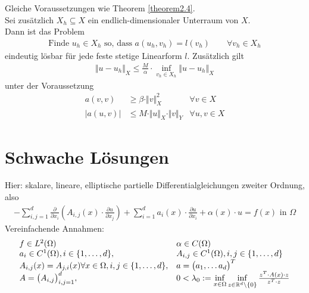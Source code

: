 \begin{theorem}\label{theorem2.5}
	Gleiche Voraussetzungen wie Theorem \ref{theorem2.4}.\\
	Sei zusätzlich $X_h\subseteq X$ ein endlich-dimensionaler Unterraum von $X$.\\
	Dann ist das Problem
	\begin{align*}
		\text{Finde }u_h\in X_h\text{ so, dass }
		a(u_h,v_h)=l(v_h)\qquad\forall v_h\in X_h
	\end{align*}
	eindeutig lösbar für jede feste stetige Linearform $l$. 
	Zusätzlich gilt
	\begin{align*}
		\Vert u-u_h\Vert_X\leq\frac{M}{\alpha}\cdot\inf\limits_{v_h\in X_h}\Vert u-u_h\Vert_X
	\end{align*}
	unter der Voraussetzung
	\begin{align*}
		a(v,v)&\geq\beta\cdot\Vert v\Vert^2_X &\forall v\in X\\
		\big|a(u,v)\big|&\leq M\cdot\Vert u\Vert_X\cdot\Vert v\Vert_Y &\forall u,v\in X
	\end{align*}
\end{theorem}

\section{Schwache Lösungen} %
Hier: skalare, lineare, elliptische partielle Differentialgleichungen zweiter Ordnung, also
\begin{align*}
	-\sum\limits_{i,j=1}^d\frac{\partial}{\partial x_i}\left(A_{i,j}(x)\cdot\frac{\partial u}{\partial x_j}\right)+\sum\limits_{i=1}^d a_i(x)\cdot\frac{\partial u}{\partial x_i}+\alpha(x)\cdot u=f(x)\text{ in }\Omega
\end{align*}
Vereinfachende Annahmen:
\begin{align*}
	\begin{array}{ll}
		f\in L^2(\Omega)&\alpha \in C(\Omega)\\
		a_i\in C^1(\Omega),i\in\lbrace1,\ldots,d\rbrace, & A_{i,j}\in C^1(\Omega), i,j\in\lbrace1,\ldots,d\rbrace\\
		A_{i,j}(x)=A_{j,i}(x)\forall x\in\Omega, i,j\in\lbrace1,\ldots,d\rbrace, & a=\big(a_1,\ldots a_d\big)^T\\
		A=\big(A_{i,j}\big)^d_{i,j=1},& 0<\lambda_0:=\inf\limits_{x\in\Omega}\inf\limits_{z\in\mathbb{R}^d\setminus\lbrace0\rbrace}\frac{z^T\cdot A(x)\cdot z}{z^T\cdot z}
	\end{array}
\end{align*}

